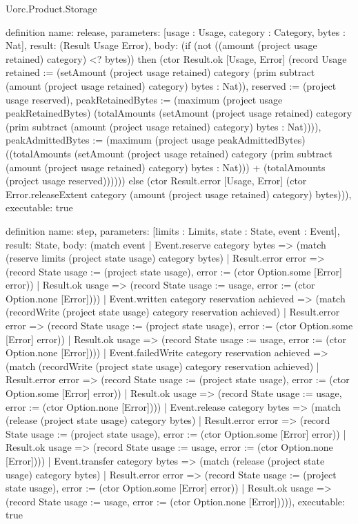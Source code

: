 \begin{lexlean}{Uorc.Product.Storage}
\begin{semanticmodule}
definition{
  name: release,
  parameters: [usage : Usage, category : Category, bytes : Nat],
  result: (Result Usage Error),
  body: (if (not ((amount (project usage retained) category) <? bytes)) then (ctor Result.ok [Usage, Error] (record Usage {retained := (setAmount (project usage retained) category (prim subtract (amount (project usage retained) category) bytes : Nat)), reserved := (project usage reserved), peakRetainedBytes := (maximum (project usage peakRetainedBytes) (totalAmounts (setAmount (project usage retained) category (prim subtract (amount (project usage retained) category) bytes : Nat)))), peakAdmittedBytes := (maximum (project usage peakAdmittedBytes) ((totalAmounts (setAmount (project usage retained) category (prim subtract (amount (project usage retained) category) bytes : Nat))) + (totalAmounts (project usage reserved))))})) else (ctor Result.error [Usage, Error] (ctor Error.releaseExtent category (amount (project usage retained) category) bytes))),
  executable: true
}

definition{
  name: step,
  parameters: [limits : Limits, state : State, event : Event],
  result: State,
  body: (match event
    | Event.reserve category bytes => (match (reserve limits (project state usage) category bytes)
      | Result.error error => (record State {usage := (project state usage), error := (ctor Option.some [Error] error)})
      | Result.ok usage => (record State {usage := usage, error := (ctor Option.none [Error])}))
    | Event.written category reservation achieved => (match (recordWrite (project state usage) category reservation achieved)
      | Result.error error => (record State {usage := (project state usage), error := (ctor Option.some [Error] error)})
      | Result.ok usage => (record State {usage := usage, error := (ctor Option.none [Error])}))
    | Event.failedWrite category reservation achieved => (match (recordWrite (project state usage) category reservation achieved)
      | Result.error error => (record State {usage := (project state usage), error := (ctor Option.some [Error] error)})
      | Result.ok usage => (record State {usage := usage, error := (ctor Option.none [Error])}))
    | Event.release category bytes => (match (release (project state usage) category bytes)
      | Result.error error => (record State {usage := (project state usage), error := (ctor Option.some [Error] error)})
      | Result.ok usage => (record State {usage := usage, error := (ctor Option.none [Error])}))
    | Event.transfer category bytes => (match (release (project state usage) category bytes)
      | Result.error error => (record State {usage := (project state usage), error := (ctor Option.some [Error] error)})
      | Result.ok usage => (record State {usage := usage, error := (ctor Option.none [Error])}))),
  executable: true
}


\end{semanticmodule}
\end{lexlean}
